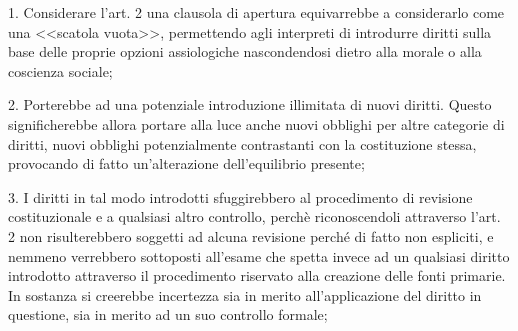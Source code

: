 1. Considerare l'art. 2 una clausola di apertura equivarrebbe a considerarlo come una <<scatola vuota>>, permettendo agli interpreti di introdurre diritti sulla base delle proprie opzioni assiologiche nascondendosi dietro alla morale o alla coscienza sociale;

2. Porterebbe ad una potenziale introduzione illimitata di nuovi diritti. Questo significherebbe allora portare alla luce anche nuovi obblighi per altre categorie di diritti, nuovi obblighi potenzialmente contrastanti con la costituzione stessa, provocando di fatto un'alterazione dell'equilibrio presente;

3. I diritti in tal modo introdotti sfuggirebbero al procedimento di revisione costituzionale e a qualsiasi altro controllo, perchè riconoscendoli attraverso l'art. 2 non risulterebbero soggetti ad alcuna revisione perché di fatto non espliciti, e nemmeno verrebbero sottoposti all'esame che spetta invece ad un qualsiasi diritto introdotto attraverso il procedimento riservato alla creazione delle fonti primarie. In sostanza si creerebbe incertezza sia in merito all'applicazione del diritto in questione, sia in merito ad un suo controllo formale;

